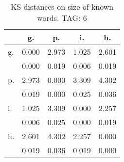 \begin{table}[h!]
\begin{center}
\begin{tabular}{| l | c | c | c | c |}\hline
 & g. & p. & i. & h. \\\hline
g. & 0.000  & 2.973  & 1.025  & 2.601 \\\hline
 & 0.000  & 0.019  & 0.006  & 0.019 \\\hline
p. & 2.973  & 0.000  & 3.309  & 4.302 \\\hline
 & 0.019  & 0.000  & 0.025  & 0.036 \\\hline
i. & 1.025  & 3.309  & 0.000  & 2.257 \\\hline
 & 0.006  & 0.025  & 0.000  & 0.019 \\\hline
h. & 2.601  & 4.302  & 2.257  & 0.000 \\\hline
 & 0.019  & 0.036  & 0.019  & 0.000 \\\hline
\end{tabular}
\caption{KS distances on size of known words. TAG: 6}
\end{center}
\end{table}